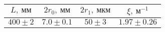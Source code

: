 \begin{tabular}{|c|c|c|c|}
  \hline
  $L,\ мм$ & $2r_0,\ мм$ & $2r_1,\ мкм$ & $\xi,\ м^{-1}$ \\ \hline
  $400 \pm 2$ & $7.0 \pm 0.1$ & $50 \pm 3$ & $1.97 \pm 0.26$ \\ \hline
\end{tabular}